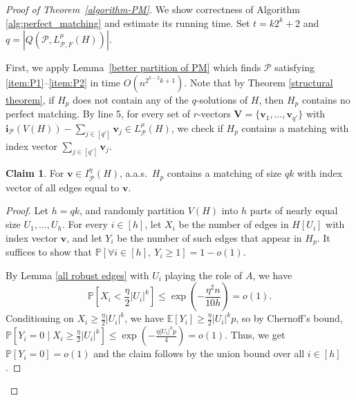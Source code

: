 \documentclass[11pt, letterpaper]{amsart}
\theoremstyle{plain}
\numberwithin{equation}{section}
\theoremstyle{definition}
\newtheorem{claim}[thm]{Claim}
\newcommand{\red}{\textcolor[rgb]{1.00,0.00,0.00}}
\newcommand\card[1]{\left| #1 \right|}
\renewcommand{\vec}[1]{{\mathbf #1}}
\begin{document}
    \begin{proof}[Proof of Theorem~\ref{algorithm-PM}]
We show correctness of Algorithm \ref{alg:perfect_matching} and estimate its running time. Set $t=k 2^k+2$ and \(q=\card{Q(\mathcal{P},L_{\mathcal{P},F}^{\mu}(H))}\).%

        First, we apply Lemma~\ref{better partition of PM} which finds $ \mathcal{P} $ satisfying \ref{item:P1}--\ref{item:P2} in time $O(n^{2^{k-2}k+1})$. 
Note that by Theorem \ref{structural theorem}, if $H_p$ does not contain any of the $q$-solutions of $H$, then $H_p$ contains no perfect matching.
By line 5, for every set of $r$-vectors $\vec{V}=\{\vec{v_1},\dots, \vec{v_{q'}}\}$ with $ {\vec{i}}_{\mathcal{P}}(V(H)) - \sum_{j\in [q']}\vec{v_j} \in L^{\mu}_{\mathcal{P}}(H) $, we check if $H_p$ contains a matching with index vector $\sum_{j\in [q']}\vec{v_j}$.

\begin{claim}
For $\vec{v}\in I_{\mathcal P}^{\eta}(H)$, a.a.s.~$H_p$ contains a matching of size $qk$ with index vector of all edges equal to $\vec{v}$.
\end{claim}

\begin{proof}
Let \(h=qk\), and randomly partition \(V(H)\) into \(h\) parts of nearly equal size \(U_1,\dots,U_h\). For every \(i\in [h]\), let \(X_i\) be the number of edges in \(H[U_i]\) with index vector \(\vec{v}\), and let \(Y_i\) be the number of such edges that appear in \(H_p\). It suffices to show that \(\mathbb{P}\left[\forall i\in [h],\ Y_i\ge 1\right]=1-o(1).\)

By Lemma \ref{all robust edges} with \(U_i\) playing the role of \(A\), we have 
\[
\mathbb{P}[X_i<\frac{\eta}{2} \card{U_i}^k]\le \exp{\left(-\frac{{\eta}^2n}{10h}\right)}=o(1).
\] 
Conditioning on \(X_i\ge \frac{\eta}{2} \card{U_i}^k\), we have \(\mathbb{E}[Y_i]\ge \frac{\eta }{2}\card{U_i}^kp\), so by Chernoff's bound, \(\mathbb{P}[Y_i=0\mid X_i\ge \frac{\eta}{2} \card{U_i}^k]\le \exp{\left(-\frac{\eta\card{U_i}^kp}{4}\right)}=o(1).\) 
Thus, we get $\mathbb{P}[Y_i=0]=o(1)$ and the claim follows by the union bound over all \(i\in[h]\).  
\end{proof}


\end{proof}
\end{document}
